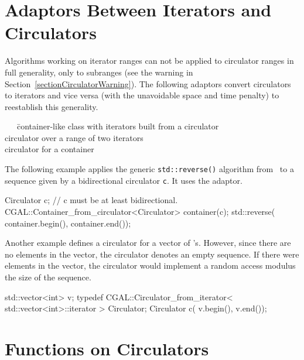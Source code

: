 \section{Adaptors Between Iterators and Circulators}
\label{sectionCirculatorAdaptor}

Algorithms working on iterator ranges can not be applied to circulator
ranges in full generality, only to subranges (see the warning in
Section~\ref{sectionCirculatorWarning}). The following adaptors
convert circulators to iterators and vice versa (with the unavoidable
space and time penalty) to reestablish this generality.


\begin{tabbing}
  \ \ \ \=
      container-like class with iterators built from a circulator\\
    \>
      circulator over a range of two iterators\\
   \>
      circulator for a container
\end{tabbing}

The following example applies the generic {\tt std::reverse()} algorithm 
from \stl\ to a sequence given by a bidirectional circulator {\tt c}.
It uses the  adaptor.

\begin{ccExampleCode}
Circulator c;  // c must be at least bidirectional.
CGAL::Container_from_circulator<Circulator> container(c);
std::reverse( container.begin(), container.end());
\end{ccExampleCode}

Another example defines a circulator  for a vector of
's. However, since there are no elements in the vector, the
circulator denotes an empty sequence.  If there were elements in the
vector, the circulator would implement a random access modulus the
size of the sequence.

\begin{ccExampleCode}
std::vector<int> v;
typedef  CGAL::Circulator_from_iterator< 
             std::vector<int>::iterator > Circulator;
Circulator c( v.begin(), v.end());
\end{ccExampleCode}

\section{Functions on Circulators}
\label{sectionCirculatorFunctions}

